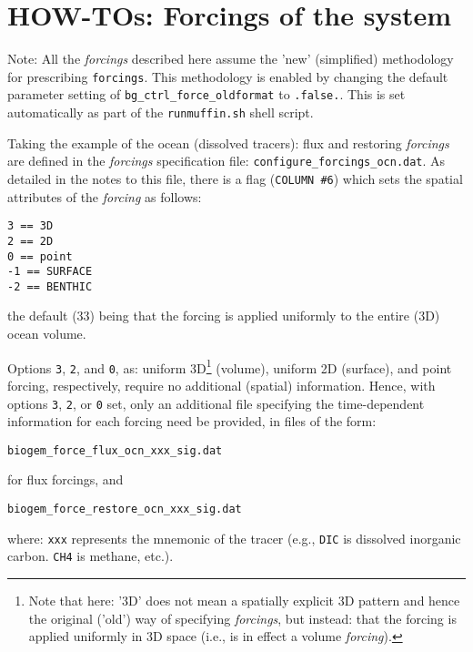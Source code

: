 \documentclass[10pt,twoside]{article}
\begin{document}
\newpage
\section{HOW-TOs: Forcings of the system}\label{how-to-5}

Note: All the \textit{forcings} described here assume the 'new' (simplified) methodology for prescribing \texttt{forcings}. This methodology is enabled by changing the default parameter setting of \texttt{bg\_ctrl\_force\_oldformat} to \texttt{.false.}. This is set automatically as part of the \texttt{runmuffin.sh} shell script.

Taking the example of the ocean (dissolved tracers): flux and restoring \textit{forcings} are defined in the \textit{forcings} specification file: \texttt{configure\_forcings\_ocn.dat}. As detailed in the notes to this file, there is a flag (\texttt{COLUMN \#6}) which sets the spatial attributes of the \textit{forcing} as follows: 
\vspace{-10pt}\begin{verbatim}
3 == 3D
2 == 2D
0 == point
-1 == SURFACE
-2 == BENTHIC
\end{verbatim}\vspace{-10pt}
the default (33) being that the forcing is applied uniformly to the entire (3D) ocean volume.

Options \texttt{3}, \texttt{2}, and \texttt{0}, as: uniform 3D\footnote{Note that here: '3D' does not mean a spatially explicit 3D pattern and hence the original ('old') way of specifying \textit{forcings}, but instead: that the forcing is applied uniformly in 3D space (i.e., is in effect a volume \textit{forcing}).} (volume), uniform 2D (surface), and point forcing, respectively, require no additional (spatial) information. Hence, with options \texttt{3}, \texttt{2}, or \texttt{0} set, only an additional file specifying the time-dependent information for each forcing need be provided, in files of the form:
\vspace{-10pt}\begin{verbatim}
biogem_force_flux_ocn_xxx_sig.dat
\end{verbatim}\vspace{-10pt}
for flux forcings, and 
\vspace{-10pt}\begin{verbatim}
biogem_force_restore_ocn_xxx_sig.dat
\end{verbatim}\vspace{-10pt}
where: \texttt{xxx} represents the mnemonic of the tracer (e.g., \texttt{DIC} is dissolved inorganic carbon. \texttt{CH4} is methane, etc.).
\end{document}
